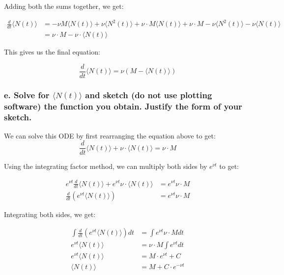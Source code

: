 \documentclass{article}
\begin{document}
Adding both the sums together, we get:

\begin{align*}
    \frac{d}{dt} \langle N(t) \rangle & = -\nu M \langle N(t) \rangle + \nu \langle N^2(t) \rangle + \nu \cdot M \langle N(t) \rangle + \nu \cdot M - \nu \langle N^2(t) \rangle - \nu \langle N(t) \rangle \\
                                      & = \nu \cdot M - \nu \cdot \langle N(t) \rangle
\end{align*}

This gives us the final equation:

\begin{equation}
    \boxed{\frac{d}{dt} \langle N(t) \rangle = \nu(M - \langle N(t) \rangle)}
\end{equation}

\subsubsection*{e. Solve for $\langle N(t) \rangle$ and sketch (do not use plotting software) the function you obtain. Justify the form of your sketch.}

We can solve this ODE by first rearranging the equation above to get:
\[
    \frac{d}{dt} \langle N(t) \rangle + \nu \cdot \langle N(t) \rangle = \nu \cdot M
\]

Using the integrating factor method, we can multiply both sides by $e^{\nu t}$
to get:

\begin{align*}
    e^{\nu t} \frac{d}{dt} \langle N(t) \rangle + e^{\nu t} \nu \cdot \langle N(t) \rangle & = e^{\nu t} \nu \cdot M \\
    \frac{d}{dt} (e^{\nu t} \langle N(t) \rangle)                                          & = e^{\nu t} \nu \cdot M
\end{align*}

Integrating both sides, we get:

\begin{align*}
    \int \frac{d}{dt} (e^{\nu t} \langle N(t) \rangle) dt & = \int e^{\nu t} \nu \cdot M dt \\
    e^{\nu t} \langle N(t) \rangle                        & = \nu \cdot M \int e^{\nu t} dt \\
    e^{\nu t} \langle N(t) \rangle                        & = M \cdot e^{\nu t} + C         \\
    \langle N(t) \rangle                                  & = M + C \cdot e^{-\nu t}
\end{align*}
\end{document}
